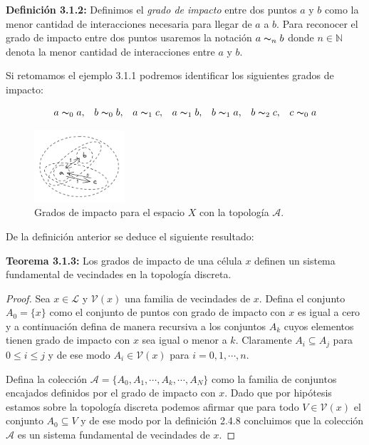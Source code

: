 \textbf{Definición 3.1.2:} Definimos el \textit{grado de impacto} entre dos puntos $a$ y $b$ como la menor cantidad de interacciones necesaria para llegar de $a$ a $b$. Para reconocer el grado de impacto entre dos puntos usaremos la notación $a\thicksim_n b$ donde $n\in\mathbb{N}$ denota la menor cantidad de interacciones entre $a$ y $b$.

Si retomamos el ejemplo 3.1.1 podremos identificar los siguientes grados de impacto:

$$\begin{array}{ccccccc}
    a\thicksim_0 a, & b\thicksim_0 b, & a\thicksim_1 c, & a\thicksim_1 b, &
    b\thicksim_1 a, & b\thicksim_2 c, & c\thicksim_0 a
\end{array}$$
\begin{figure}[h]
  \centering
    \includegraphics[width=0.3\textwidth]{Imagenes/grados_de_impacto.PNG}
  \caption{Grados de impacto para el espacio $X$ con la topología $\mathcal{A}$.}
  \label{fig:gradoImpacto}
\end{figure}

De la definición anterior se deduce el siguiente resultado:

\textbf{Teorema 3.1.3:} Los grados de impacto de una célula $x$ definen un sistema fundamental de vecindades en la topología discreta.

\begin{proof}
Sea $x\in\mathcal{L}$ y $\mathcal{V}(x)$ una familia de vecindades de $x$. Defina el conjunto $A_0=\{x\}$ como el conjunto de puntos con grado de impacto con $x$ es igual a cero y a continuación defina de manera recursiva a los conjuntos $A_k$ cuyos elementos tienen grado de impacto con $x$ sea igual o menor a $k$. Claramente $A_i\subseteq A_j$ para $0\leq i\leq j$ y de ese modo $A_i\in\mathcal{V}(x)$ para $i=0,1,\cdots,n$.

Defina la colección $\mathcal{A}=\{A_0,A_1,\cdots,A_k,\cdots,A_N\}$ como la familia de conjuntos encajados definidos por el grado de impacto con $x$. Dado que por hipótesis estamos sobre la topología discreta podemos afirmar que para todo $V\in\mathcal{V}(x)$ el conjunto $A_0\subseteq V$ y de ese modo por la definición 2.4.8 concluimos que la colección $\mathcal{A}$ es un sistema fundamental de vecindades de $x$.
\end{proof}

